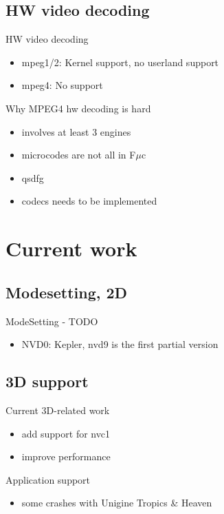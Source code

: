 \documentclass[11pt,english,compress]{beamer}
\begin{document}
	\subsection{HW video decoding}
		\begin{frame}
			\begin{block}{HW video decoding}
				\begin{itemize}
					\item mpeg1/2: Kernel support, no userland support
					\item mpeg4: No support
				\end{itemize}
			\end{block}

			\begin{block}{Why MPEG4 hw decoding is hard}
				\begin{itemize}
					\item involves at least 3 engines
					\item microcodes are not all in F$\mu$c
					\item qsdfg
					\item codecs needs to be implemented
				\end{itemize}
			\end{block}
		\end{frame}

\section{Current work}
	\subsection{Modesetting, 2D}
		\begin{frame}
			\begin{block}{ModeSetting - TODO}
				\begin{itemize}
					\item NVD0: Kepler, nvd9 is the first partial version
				\end{itemize}
			\end{block}
		\end{frame}

	\subsection{3D support}
		\begin{frame}
			\begin{block}{Current 3D-related work}
				\begin{itemize}
					\item add support for nvc1
					\item improve performance
				\end{itemize}
			\end{block}

			\begin{block}{Application support}
				\begin{itemize}
					\item some crashes with Unigine Tropics \& Heaven
				\end{itemize}
			\end{block}
		\end{frame}
\end{document}
